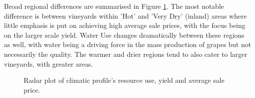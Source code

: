 \documentclass[review,12pt,authoryear]{elsarticle}
\begin{document}
\begin{linenumbers}
%
%
%
%
%
%
%
%
%

Broad regional differences are summarised in Figure \ref{fig:spider}. The most notable difference is between vineyards within 'Hot' and 'Very Dry' (inland) areas where little emphasis is put on achieving high average sale prices, with the focus being on the larger scale yield. Water Use changes dramatically between these regions as well, with water being a driving force in the mass production of grapes but not necessarily the quality. The warmer and drier regions tend to also cater to larger vineyards, with greater areas. 
\par
\begin{figure}
  \caption{Radar plot of climatic profile's resource use, yield and average sale price.}\label{fig:spider}
\end{figure}


\end{linenumbers}
\end{document}
